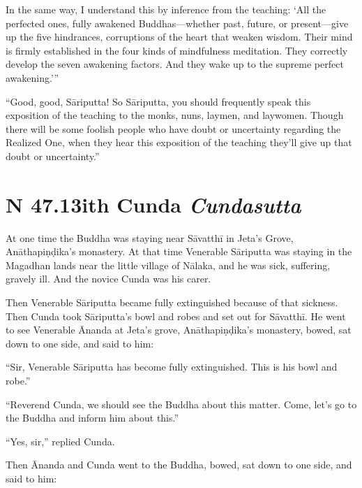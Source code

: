 \documentclass[12pt,openany]{book}%
\newcommand*{\suttatitleacronym}[1]{\smaller[2]{#1}\vspace*{.3em}}
\newcommand*{\suttatitletranslation}[1]{\linebreak{#1}}
\newcommand*{\suttatitleroot}[1]{\linebreak\smaller[2]\itshape{#1}}
\newcommand*{\tocacronym}[1]{\hspace*{-3.3em}{#1}\quad}
\newcommand*{\toctranslation}[1]{#1}
\newcommand*{\tocroot}[1]{(\textit{#1})}
\begin{document}
In the same way, I understand this by inference from the teaching: ‘All the perfected ones, fully awakened Buddhas—whether past, future, or present—give up the five hindrances, corruptions of the heart that weaken wisdom. Their mind is firmly established in the four kinds of mindfulness meditation. They correctly develop the seven awakening factors. And they wake up to the supreme perfect awakening.’” 

“Good, good, \textsanskrit{Sāriputta}! So \textsanskrit{Sāriputta}, you should frequently speak this exposition of the teaching to the monks, nuns, laymen, and laywomen. Though there will be some foolish people who have doubt or uncertainty regarding the Realized One, when they hear this exposition of the teaching they’ll give up that doubt or uncertainty.” 

%
\section*{{\suttatitleacronym SN 47.13}{\suttatitletranslation With Cunda }{\suttatitleroot Cundasutta}}
\addcontentsline{toc}{section}{\tocacronym{SN 47.13} \toctranslation{With Cunda } \tocroot{Cundasutta}}

At one time the Buddha was staying near \textsanskrit{Sāvatthī} in Jeta’s Grove, \textsanskrit{Anāthapiṇḍika}’s monastery. At that time Venerable \textsanskrit{Sāriputta} was staying in the Magadhan lands near the little village of \textsanskrit{Nālaka}, and he was sick, suffering, gravely ill. And the novice Cunda was his carer. 

Then Venerable \textsanskrit{Sāriputta} became fully extinguished because of that sickness. Then Cunda took \textsanskrit{Sāriputta}’s bowl and robes and set out for \textsanskrit{Sāvatthī}. He went to see Venerable Ānanda at Jeta’s grove, \textsanskrit{Anāthapiṇḍika}’s monastery, bowed, sat down to one side, and said to him: 

“Sir, Venerable \textsanskrit{Sāriputta} has become fully extinguished. This is his bowl and robe.” 

“Reverend Cunda, we should see the Buddha about this matter. Come, let’s go to the Buddha and inform him about this.” 

“Yes, sir,” replied Cunda. 

Then Ānanda and Cunda went to the Buddha, bowed, sat down to one side, and said to him: 
\end{document}
